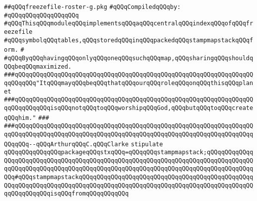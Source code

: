 \label{src/app/makelib/freezefile/freezefile-roster-g.pkg}
\verb|##qQQqfreezefile-roster-g.pkg|\newline
\newline
\verb|#qQQqCompiledqQQqby:|\newline
\verb|#qQQqqQQqqQQqqQQqqQQq|\newline
\newline
\newline
\newline
\verb|#qQQqThisqQQqmoduleqQQqimplementsqQQqaqQQqcentralqQQqindexqQQqofqQQqfreezefile|\newline
\verb|#qQQqsymbolqQQqtables,qQQqstoredqQQqinqQQqpackedqQQqstampmapstackqQQqform.|\newline
\verb|#|\newline
\verb|#qQQqByqQQqhavingqQQqonlyqQQqoneqQQqsuchqQQqmap,qQQqsharingqQQqshouldqQQqbeqQQqmaximized.|\newline
\newline
\newline
\newline
\verb|###qQQqqQQqqQQqqQQqqQQqqQQqqQQqqQQqqQQqqQQqqQQqqQQqqQQqqQQqqQQqqQQqqQQqqQQqqQQq"ItqQQqmayqQQqbeqQQqthatqQQqourqQQqroleqQQqonqQQqthisqQQqplanet|\newline
\verb|###qQQqqQQqqQQqqQQqqQQqqQQqqQQqqQQqqQQqqQQqqQQqqQQqqQQqqQQqqQQqqQQqqQQqqQQqqQQqqQQqisqQQqnotqQQqtoqQQqworshipqQQqGod,qQQqbutqQQqtoqQQqcreateqQQqhim."|\newline
\verb|###|\newline
\verb|###qQQqqQQqqQQqqQQqqQQqqQQqqQQqqQQqqQQqqQQqqQQqqQQqqQQqqQQqqQQqqQQqqQQqqQQqqQQqqQQqqQQqqQQqqQQqqQQqqQQqqQQqqQQqqQQqqQQqqQQqqQQqqQQqqQQqqQQqqQQqqQQq--qQQqArthurqQQqC.qQQqClarke|\newline
\newline
\newline
\newline
\verb|stipulate|\newline
\verb|qQQqqQQqqQQqqQQqpackageqQQqstxqQQq=qQQqqQQqstampmapstack;qQQqqQQqqQQqqQQqqQQqqQQqqQQqqQQqqQQqqQQqqQQqqQQqqQQqqQQqqQQqqQQqqQQqqQQqqQQqqQQqqQQqqQQqqQQqqQQqqQQqqQQqqQQqqQQqqQQqqQQqqQQqqQQqqQQqqQQqqQQqqQQqqQQqqQQqqQQq#qQQqstampmapstackqQQqqQQqqQQqqQQqqQQqqQQqqQQqqQQqqQQqqQQqqQQqqQQqqQQqqQQqqQQqqQQqqQQqqQQqqQQqqQQqqQQqqQQqqQQqqQQqqQQqqQQqqQQqqQQqqQQqqQQqqQQqqQQqqQQqisqQQqfromqQQqqQQqqQQq|\newline
